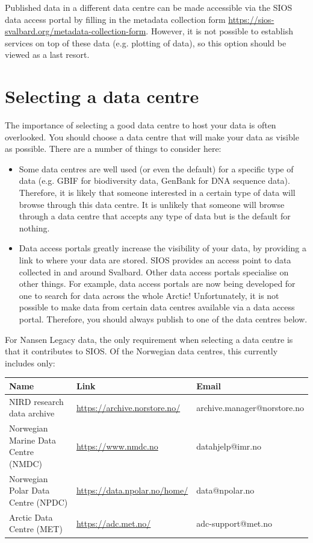 \documentclass[a4paper,english, 11pt]{article}
\begin{document}
Published data in a different data centre can be made accessible via the SIOS data access portal by filling in the metadata collection form \url{https://sios-svalbard.org/metadata-collection-form}. However, it is not possible to establish services on top of these data (e.g. plotting of data), so this option should be viewed as a last resort.

\newpage
\section{Selecting a data centre}
\label{s:datacentre}

The importance of selecting a good data centre to host your data is often overlooked. You should choose a data centre that will make your data as visible as possible. There are a number of things to consider here:

\begin{itemize}
\item Some data centres are well used (or even the default) for a specific type of data (e.g. GBIF for biodiversity data, GenBank for DNA sequence data). Therefore, it is likely that someone interested in a certain type of data will browse through this data centre. It is unlikely that someone will browse through a data centre that accepts any type of data but is the default for nothing.
\item Data access portals greatly increase the visibility of your data, by providing a link to where your data are stored. SIOS provides an access point to data collected in and around Svalbard. Other data access portals specialise on other things. For example, data access portals are now being developed for one to search for data across the whole Arctic! Unfortunately, it is not possible to make data from certain data centres available via a data access portal. Therefore, you should always publish to one of the data centres below.
\end{itemize}

For Nansen Legacy data, the only requirement when selecting a data centre is that it contributes to SIOS. Of the Norwegian data centres, this currently includes only: 

\begin{center}
\begin{tabular}{ |p{}|p{}|p{}|} 
\hline
Name & Link & Email  \\
\hline
NIRD research data archive & \url{https://archive.norstore.no/} & archive.manager@norstore.no \\  
\hline
Norwegian Marine Data Centre (NMDC) & \url{https://www.nmdc.no} & datahjelp@imr.no \\   
\hline
Norwegian Polar Data Centre (NPDC) & \url{https://data.npolar.no/home/} & data@npolar.no \\     
\hline
Arctic Data Centre (MET) & \url{https://adc.met.no/} & adc-support@met.no \\   
\hline
\end{tabular}
\end{center}
\end{document}
